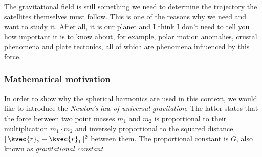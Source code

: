 The gravitational field is still something we need to determine the trajectory the satellites themselves must follow. This is one of the reasons 
why we need and want to study it. After all, it is our planet and I think I don't need to tell you how important it is to know about, 
for example, polar motion anomalies, crustal phenomena and plate tectonics, all of which are phenomena influenced by this force.

\subsubsection{Mathematical motivation}
In order to show why the spherical harmonics are used in this context, we would like to introduce the \emph{Newton's law of universal gravitation}. 
The latter states that the force between two point masses $m_1$ and $m_2$ is proportional to their multiplication $m_1\cdot m_2$ and inversely 
proportional to the squared distance $|\,\kvec{r}_2-\kvec{r}_1 \,|^2$ between them. The proportional constant is $G$, also known as 
\emph{gravitational constant}. 


